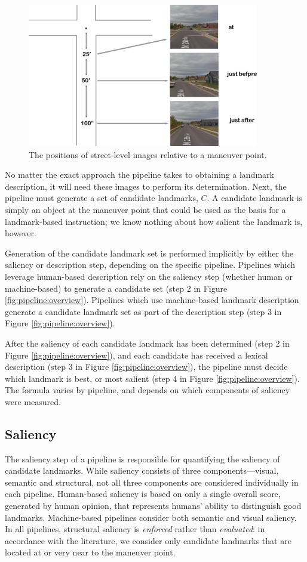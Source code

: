 \begin{figure}[htbp]
  \centering
  \includegraphics[width=0.9\textwidth]{images/sv.pdf}
  \caption{The positions of street-level images relative to a maneuver point.}
  \label{fig:sv}
\end{figure}

No matter the exact approach the pipeline takes to obtaining a landmark description, it will need these images to perform its determination. Next, the pipeline must generate a set of candidate landmarks, $C$. A candidate landmark is simply an object at the maneuver point that could be used as the basis for a landmark-based instruction; we know nothing about how salient the landmark is, however. 
	
Generation of the candidate landmark set is performed implicitly by either the saliency or description step, depending on the specific pipeline. Pipelines which leverage human-based description rely on the saliency step (whether human or machine-based) to generate a candidate set (step 2 in Figure \ref{fig:pipeline:overview}). Pipelines which use machine-based landmark description generate a candidate landmark set as part of the description step (step 3 in Figure \ref{fig:pipeline:overview}).

After the saliency of each candidate landmark has been determined (step 2 in Figure \ref{fig:pipeline:overview}), and each candidate has received a lexical description (step 3 in Figure \ref{fig:pipeline:overview}), the pipeline must decide which landmark is best, or most salient (step 4 in Figure \ref{fig:pipeline:overview}). The formula varies by pipeline, and depends on which components of saliency were measured.

\subsection{Saliency}
The saliency step of a pipeline is responsible for quantifying the saliency of candidate landmarks. While saliency consists of three components---visual, semantic and structural, not all three components are considered individually in each pipeline. Human-based saliency is based on only a single overall score, generated by human opinion, that represents humans' ability to distinguish good landmarks. Machine-based pipelines consider both semantic and visual saliency. In all pipelines, structural saliency is \textit{enforced} rather than \textit{evaluated}: in accordance with the literature, we consider only candidate landmarks that are located at or very near to the maneuver point.

